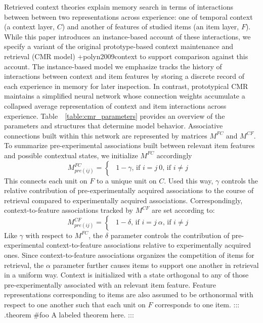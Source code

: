 Retrieved context theories explain memory search in terms of interactions between between two representations across experience: one of temporal context (a context layer, $C$) and another of features of studied items (an item layer, $F$). While this paper introduces an instance-based account of these interactions, we specify a variant of the original prototype-based context maintenance and retrieval (CMR model) +{}{}{polyn2009context} to support comparison against this account. The instance-based model we emphasize tracks the history of interactions between context and item features by storing a discrete record of each experience in memory for later inspection. In contrast, prototypical CMR maintains a simplified neural network whose connection weights accumulate a collapsed average representation of context and item interactions across experience. Table ~\ref{table:cmr_parameters} provides an overview of the parameters and structures that determine model behavior.\markdownRendererInterblockSeparator
{}\markdownRendererInterblockSeparator
{}Associative connections built within this network are represented by matrices $M^{FC}$ and $M^{CF}$.\markdownRendererInterblockSeparator
{}To summarize pre-experimental associations built between relevant item features and possible contextual states, we initialize $M^{FC}$ accordingly\markdownRendererInterblockSeparator
{}$$M^{FC}_{pre(ij)} = \begin{cases} \begin{alignedat}{2} 1 - \gamma \text{, if } i=j \ 0 \text{, if } i \neq j\ \end{alignedat} \end{cases}$$\markdownRendererInterblockSeparator
{}This connects each unit on $F$ to a unique unit on $C$. Used this way, $\gamma$ controls the relative contribution of pre-experimentally acquired associations to the course of retrieval compared to experimentally acquired associations. Correspondingly, context-to-feature associations tracked by $M^{CF}$ are set according to:\markdownRendererInterblockSeparator
{}$$M^{CF}_{pre(ij)} = \begin{cases} \begin{alignedat}{2} 1 - \delta \text{, if } i=j \ \alpha \text{, if } i \neq j\ \end{alignedat} \end{cases}$$\markdownRendererInterblockSeparator
{}Like $\gamma$ with respect to $M^{FC}$, the $\delta$ parameter controls the contribution of pre-experimental context-to-feature associations relative to experimentally acquired ones. Since context-to-feature associations organizes the competition of items for retrieval, the $\alpha$ parameter further causes items to support one another in retrieval in a uniform way.\markdownRendererInterblockSeparator
{}Context is initialized with a state orthogonal to any of those pre-experimentally associated with an relevant item feature. Feature representations corresponding to items are also assumed to be orthonormal with respect to one another such that each unit on $F$ corresponds to one item.\markdownRendererInterblockSeparator
{}::: {.theorem #foo} A labeled theorem here. :::\relax